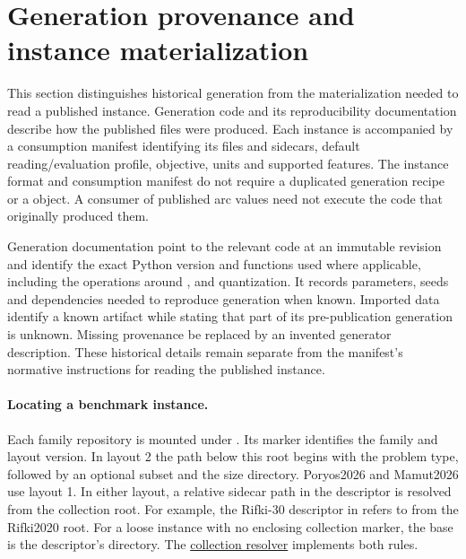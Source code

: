 \section{Generation provenance and instance materialization}\label{sec:generation}
This section distinguishes historical generation from the materialization needed to read a published instance. Generation code and its reproducibility documentation describe how the published files were produced. Each instance is accompanied by a consumption manifest identifying its files and sidecars, default reading/evaluation profile, objective, units and supported features. The instance format and consumption manifest do not require a duplicated generation recipe or a  object. A consumer of published arc values need not execute the code that originally produced them.

Generation documentation \must{} point to the relevant code at an immutable revision and identify the exact Python version and functions used where applicable, including the operations around ,  and quantization. It records parameters, seeds and dependencies needed to reproduce generation when known. Imported data \may{} identify a known artifact while stating that part of its pre-publication generation is unknown. Missing provenance \mustnot{} be replaced by an invented generator description. These historical details remain separate from the manifest's normative instructions for reading the published instance.

\paragraph{Locating a benchmark instance.}
Each family repository is mounted under . Its  marker identifies the family and layout version. In layout 2 the path below this root begins with the problem type, followed by an optional subset and the size directory. Poryos2026 and Mamut2026 use layout 1. In either layout, a relative sidecar path in the descriptor is resolved from the collection root. For example, the Rifki-30 descriptor in  refers to  from the Rifki2020 root. For a loose instance with no enclosing collection marker, the base is the descriptor's directory. The \href{https://github.com/ANR-MAMUT/MAMUT-routing-lib/blob/e032f2b9b9d1ba16a561325a07ab59cf39f8e5d5/src/mamut_routing_lib/sidecars.py}{collection resolver} implements both rules.

